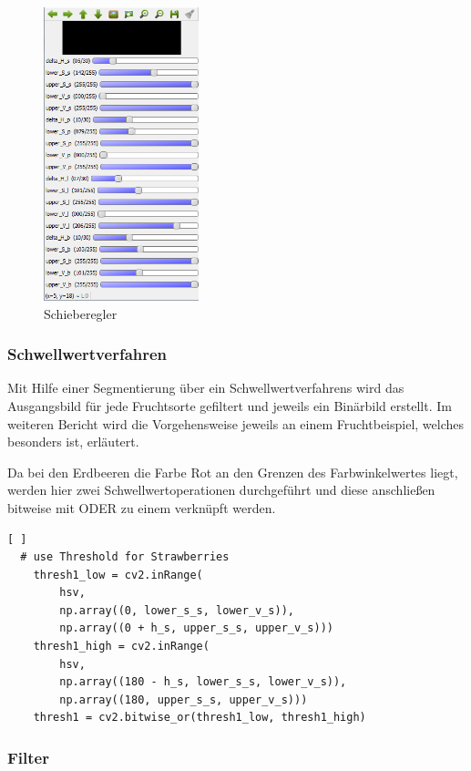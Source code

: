 \begin{figure}[H]
    \centering
    \includegraphics[width=0.4\textwidth]{Abbildungen/Regler02}
    \caption[Regler]{Schieberegler}
    \label{fig:Regler}
\end{figure}

\subsubsection{Schwellwertverfahren}

Mit Hilfe einer Segmentierung über ein Schwellwertverfahrens wird das Ausgangsbild für jede Fruchtsorte gefiltert und jeweils ein Binärbild erstellt. Im weiteren Bericht wird die Vorgehensweise jeweils an einem Fruchtbeispiel, welches besonders ist, erläutert. 

Da bei den Erdbeeren die Farbe Rot an den Grenzen des Farbwinkelwertes liegt, werden hier zwei Schwellwertoperationen durchgeführt und diese anschließen bitweise mit ODER zu einem verknüpft werden.
\lstset{language=Python}
\begin{lstlisting}[ ]
  # use Threshold for Strawberries
    thresh1_low = cv2.inRange(
        hsv,
        np.array((0, lower_s_s, lower_v_s)),
        np.array((0 + h_s, upper_s_s, upper_v_s)))
    thresh1_high = cv2.inRange(
        hsv,
        np.array((180 - h_s, lower_s_s, lower_v_s)),
        np.array((180, upper_s_s, upper_v_s)))
    thresh1 = cv2.bitwise_or(thresh1_low, thresh1_high)
\end{lstlisting}

\subsubsection{Filter}


